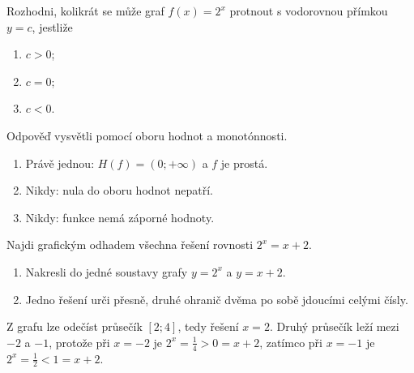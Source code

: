 \documentclass[11pt,a4paper]{article}
\begin{document}
\begin{zadaniReseniBox}[title={Rozšíření 1}]
Rozhodni, kolikrát se může graf $f(x)=2^x$ protnout s vodorovnou přímkou $y=c$, jestliže
\begin{enumerate}[label=\alph*)]
  \item $c>0$;
  \item $c=0$;
  \item $c<0$.
\end{enumerate}
Odpověď vysvětli pomocí oboru hodnot a monotónnosti.
\tcblower
\begin{enumerate}[label=\alph*)]
  \item Právě jednou: $H(f)=(0;+\infty)$ a $f$ je prostá.
  \item Nikdy: nula do oboru hodnot nepatří.
  \item Nikdy: funkce nemá záporné hodnoty.
\end{enumerate}
\end{zadaniReseniBox}

\begin{zadaniReseniBox}[title={Rozšíření 2}]
Najdi grafickým odhadem všechna řešení rovnosti $2^x=x+2$.
\begin{enumerate}[label=\alph*)]
  \item Nakresli do jedné soustavy grafy $y=2^x$ a $y=x+2$.
  \item Jedno řešení urči přesně, druhé ohranič dvěma po sobě jdoucími celými čísly.
\end{enumerate}
\tcblower
Z grafu lze odečíst průsečík $[2;4]$, tedy řešení $x=2$. Druhý průsečík leží mezi $-2$ a $-1$, protože při $x=-2$ je $2^x=\frac{1}{4}>0=x+2$, zatímco při $x=-1$ je $2^x=\frac{1}{2}<1=x+2$.
\end{zadaniReseniBox}
\end{document}
